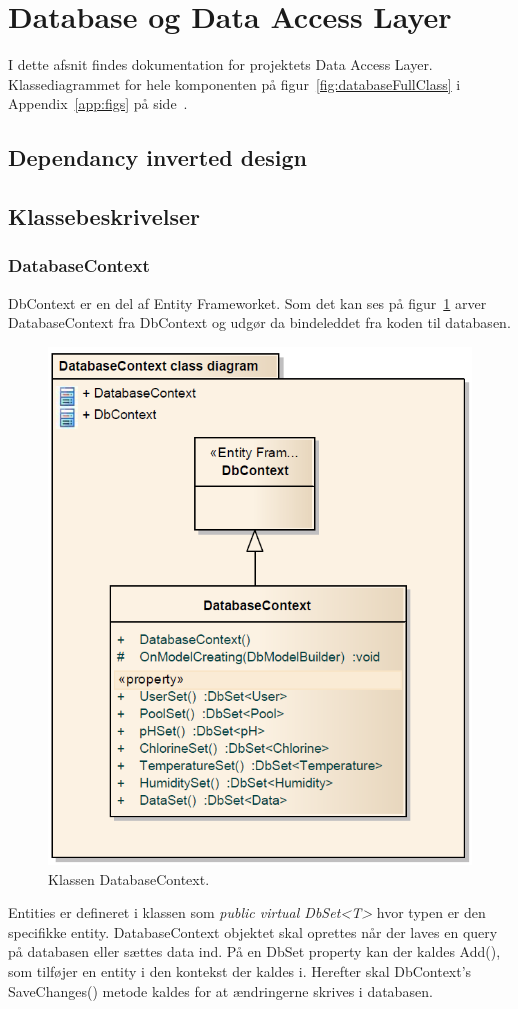 \section{Database og Data Access Layer}
I dette afsnit findes dokumentation for projektets Data Access Layer. Klassediagrammet for hele komponenten på figur~\ref{fig:databaseFullClass} i Appendix~\ref{app:figs} på side~\pageref{fig:databaseFullClass}.

\subsection{Dependancy inverted design}

\subsection{Klassebeskrivelser}
 
\subsubsection{DatabaseContext}
DbContext er en del af Entity Frameworket. Som det kan ses på figur~\ref{fig:dbContextClass} arver DatabaseContext fra DbContext \cite{microsoftdbcontext} og udgør da bindeleddet fra koden til databasen.

\begin{figure}
\centering
\includegraphics[width=0.5\linewidth]{figs/implementering/dbContextClass.PNG}
\caption{Klassen DatabaseContext.}
\label{fig:dbContextClass}
\end{figure}

Entities er defineret i klassen som \textit{public virtual DbSet<T>} hvor typen er den specifikke entity.
DatabaseContext objektet skal oprettes når der laves en query på databasen eller sættes data ind.
På en DbSet property kan der kaldes Add(), som tilføjer en entity i den kontekst der kaldes i. Herefter skal DbContext’s SaveChanges() metode kaldes for at ændringerne skrives i databasen.

